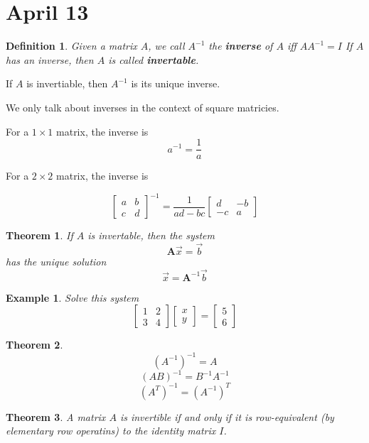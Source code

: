 \documentclass[11pt]{article}
\newtheorem{thm}{Theorem}
\newtheorem{defn}{Definition}
\newtheorem{ex}{Example}
\begin{document}
\section{April 13}


\begin{defn}
  Given a matrix $A$, we call $A^{-1}$ the \textbf{inverse} of $A$ iff
  $AA^{-1} = I$
  If $A$ has an inverse, then $A$ is called \textbf{invertable}.

\end{defn}

If $A$ is invertiable, then $A^{-1}$ is its unique inverse.


We only talk about inverses in the context of square matricies.

For a $1 \times 1$ matrix, the inverse is
\[a^{-1} = \frac{1}{a}\]

For a $2 \times 2$ matrix, the inverse is

\[\begin{bmatrix} a & b \\ c & d \end{bmatrix} ^{-1} = \frac{1}{ad-bc} \begin{bmatrix} d & -b \\ -c & a \end{bmatrix}\]


\begin{thm}
  If $A$ is invertable, then the system
  \[\mathbf{A}\vec{x} = \vec{b}\]
  has the unique solution
  \[\vec{x} = \mathbf{A}^{-1}\vec{b}\]
\end{thm}

\begin{ex}
  Solve this system
  \[\begin{bmatrix} 1 & 2 \\ 3 & 4\end{bmatrix}\begin{bmatrix} x \\ y\end{bmatrix} = \begin{bmatrix} 5 \\ 6 \end{bmatrix} \]

\end{ex}


\begin{thm}
  \[(A^{-1})^{-1} = A\]
  \[(AB)^{-1} = B^{-1}A^{-1}\]
  \[(A^{T})^{-1} = (A^{-1})^{T}\]
\end{thm}

\begin{thm}
  A matrix $A$ is invertible if and only if it is row-equivalent (by elementary row operatins) to
  the identity matrix $I$.
\end{thm}
\end{document}
